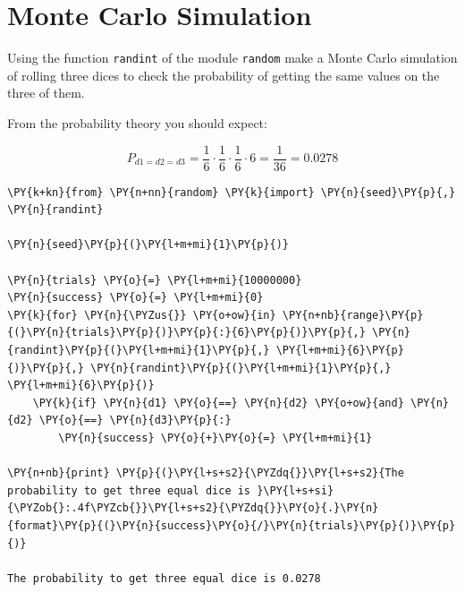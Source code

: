 \chapter{Monte Carlo Simulation}\label{introduction-to-python---lesson-8}

\begin{Exercise}[title={(Dice Simulation)}]
Using the function \texttt{randint} of the module \texttt{random} make a
Monte Carlo simulation of rolling three dices to check the probability
of getting the same values on the three of them.

From the probability theory you should expect:

\[P_{d1=d2=d3} = \frac{1}{6}\cdot\frac{1}{6}\cdot\frac{1}{6}\cdot 6 = \frac{1}{36} = 0.0278\]
\end{Exercise}
\begin{Answer}
\begin{codebox}[size=fbox, boxrule=1pt, colback=cellbackground, colframe=cellborder]
\begin{Verbatim}[commandchars=\\\{\}]
\PY{k+kn}{from} \PY{n+nn}{random} \PY{k}{import} \PY{n}{seed}\PY{p}{,} \PY{n}{randint}
        
\PY{n}{seed}\PY{p}{(}\PY{l+m+mi}{1}\PY{p}{)}
        
\PY{n}{trials} \PY{o}{=} \PY{l+m+mi}{10000000}
\PY{n}{success} \PY{o}{=} \PY{l+m+mi}{0}
\PY{k}{for} \PY{n}{\PYZus{}} \PY{o+ow}{in} \PY{n+nb}{range}\PY{p}{(}\PY{n}{trials}\PY{p}{)}\PY{p}{:}{6}\PY{p}{)}\PY{p}{,} \PY{n}{randint}\PY{p}{(}\PY{l+m+mi}{1}\PY{p}{,} \PY{l+m+mi}{6}\PY{p}{)}\PY{p}{,} \PY{n}{randint}\PY{p}{(}\PY{l+m+mi}{1}\PY{p}{,} \PY{l+m+mi}{6}\PY{p}{)}    
    \PY{k}{if} \PY{n}{d1} \PY{o}{==} \PY{n}{d2} \PY{o+ow}{and} \PY{n}{d2} \PY{o}{==} \PY{n}{d3}\PY{p}{:}
        \PY{n}{success} \PY{o}{+}\PY{o}{=} \PY{l+m+mi}{1}
    
\PY{n+nb}{print} \PY{p}{(}\PY{l+s+s2}{\PYZdq{}}\PY{l+s+s2}{The probability to get three equal dice is }\PY{l+s+si}{\PYZob{}:.4f\PYZcb{}}\PY{l+s+s2}{\PYZdq{}}\PY{o}{.}\PY{n}{format}\PY{p}{(}\PY{n}{success}\PY{o}{/}\PY{n}{trials}\PY{p}{)}\PY{p}{)}
        
The probability to get three equal dice is 0.0278
\end{Verbatim}
\end{codebox}
\end{Answer}


